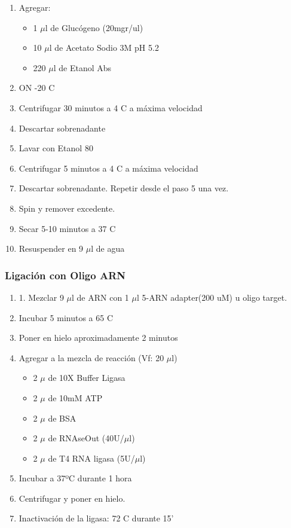 \begin{enumerate}
	\item Agregar:
		\begin{itemize}
			\item 1 $\mu$l de Glucógeno (20mgr/ul)
			\item 10 $\mu$l de Acetato Sodio 3M pH 5.2
			\item 220 $\mu$l de Etanol Abs
	\end{itemize}

	\item ON -20 \degree C
	\item Centrifugar 30 minutos a 4 \degree C a máxima velocidad
	\item Descartar sobrenadante
	\item Lavar con Etanol 80%
	\item Centrifugar 5 minutos a 4 \degree C a máxima velocidad
	\item Descartar sobrenadante. Repetir desde el paso 5 una vez. 
	\item Spin y remover excedente.
	\item Secar 5-10 minutos a 37 \degree C
	\item Resuspender en 9 $\mu$l de agua
\end{enumerate}

\subsubsection{Ligación con Oligo ARN}

\begin{enumerate}
	\item 1. Mezclar 9 $\mu$l de ARN  con 1 $\mu$l 5-ARN  adapter(200 uM) u oligo target.
	\item Incubar 5 minutos a 65 \degree C
	\item Poner en hielo aproximadamente 2 minutos
	\item Agregar a la mezcla de reacción (Vf: 20 $\mu$l)
		\begin{itemize}
			\item 2  $\mu$ de 10X Buffer Ligasa
			\item 2  $\mu$ de 10mM ATP
			\item 2  $\mu$ de BSA
			\item 2  $\mu$ de RNAseOut (40U/$\mu$l)
			\item 2  $\mu$ de T4 RNA ligasa (5U/$\mu$l)
		\end{itemize}
	\item Incubar a 37ºC durante 1 hora
	\item Centrifugar y poner en hielo.
	\item Inactivación de la ligasa: 72 \degree C durante 15'
\end{enumerate}

